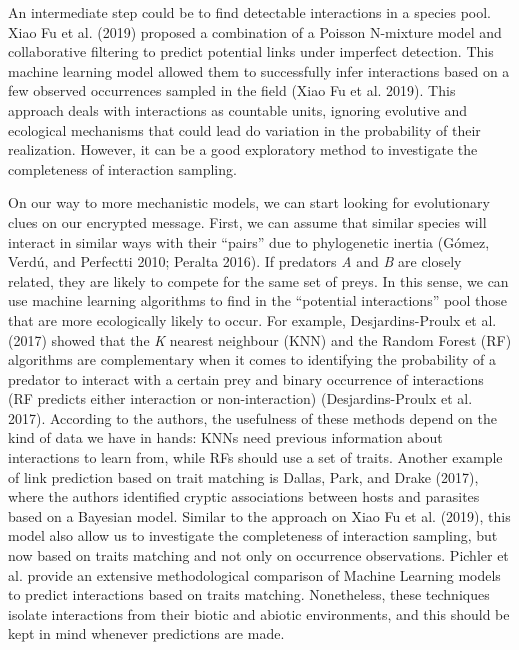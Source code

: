 \documentclass[11pt]{article}
\begin{document}
An intermediate step could be to find detectable interactions in a
species pool. Xiao Fu et al. (2019) proposed a combination of a Poisson
N-mixture model and collaborative filtering to predict potential links
under imperfect detection. This machine learning model allowed them to
successfully infer interactions based on a few observed occurrences
sampled in the field (Xiao Fu et al. 2019). This approach deals with
interactions as countable units, ignoring evolutive and ecological
mechanisms that could lead do variation in the probability of their
realization. However, it can be a good exploratory method to investigate
the completeness of interaction sampling.

On our way to more mechanistic models, we can start looking for
evolutionary clues on our encrypted message. First, we can assume that
similar species will interact in similar ways with their ``pairs'' due
to phylogenetic inertia (Gómez, Verdú, and Perfectti 2010; Peralta
2016). If predators \emph{A} and \emph{B} are closely related, they are
likely to compete for the same set of preys. In this sense, we can use
machine learning algorithms to find in the ``potential interactions''
pool those that are more ecologically likely to occur. For example,
Desjardins-Proulx et al. (2017) showed that the \emph{K} nearest
neighbour (KNN) and the Random Forest (RF) algorithms are complementary
when it comes to identifying the probability of a predator to interact
with a certain prey and binary occurrence of interactions (RF predicts
either interaction or non-interaction) (Desjardins-Proulx et al. 2017).
According to the authors, the usefulness of these methods depend on the
kind of data we have in hands: KNNs need previous information about
interactions to learn from, while RFs should use a set of traits.
Another example of link prediction based on trait matching is Dallas,
Park, and Drake (2017), where the authors identified cryptic
associations between hosts and parasites based on a Bayesian model.
Similar to the approach on Xiao Fu et al. (2019), this model also allow
us to investigate the completeness of interaction sampling, but now
based on traits matching and not only on occurrence observations.
Pichler et al. provide an extensive methodological comparison of Machine
Learning models to predict interactions based on traits matching.
Nonetheless, these techniques isolate interactions from their biotic and
abiotic environments, and this should be kept in mind whenever
predictions are made.
\end{document}
